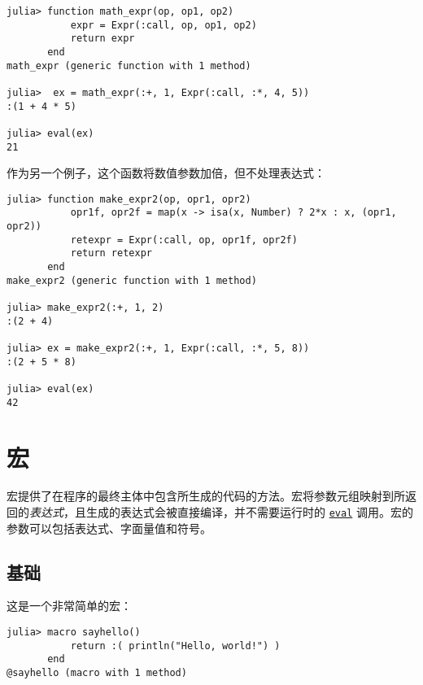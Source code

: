 \begin{verbatim}
julia> function math_expr(op, op1, op2)
           expr = Expr(:call, op, op1, op2)
           return expr
       end
math_expr (generic function with 1 method)

julia>  ex = math_expr(:+, 1, Expr(:call, :*, 4, 5))
:(1 + 4 * 5)

julia> eval(ex)
21
\end{verbatim}



作为另一个例子，这个函数将数值参数加倍，但不处理表达式：




\begin{verbatim}
julia> function make_expr2(op, opr1, opr2)
           opr1f, opr2f = map(x -> isa(x, Number) ? 2*x : x, (opr1, opr2))
           retexpr = Expr(:call, op, opr1f, opr2f)
           return retexpr
       end
make_expr2 (generic function with 1 method)

julia> make_expr2(:+, 1, 2)
:(2 + 4)

julia> ex = make_expr2(:+, 1, Expr(:call, :*, 5, 8))
:(2 + 5 * 8)

julia> eval(ex)
42
\end{verbatim}



\hypertarget{11146454106624591870}{}


\section{宏}



宏提供了在程序的最终主体中包含所生成的代码的方法。宏将参数元组映射到所返回的\emph{表达式}，且生成的表达式会被直接编译，并不需要运行时的 \hyperlink{7507639810592563424}{\texttt{eval}} 调用。宏的参数可以包括表达式、字面量值和符号。



\hypertarget{13022711559815737661}{}


\subsection{基础}



这是一个非常简单的宏：




\begin{verbatim}
julia> macro sayhello()
           return :( println("Hello, world!") )
       end
@sayhello (macro with 1 method)
\end{verbatim}



